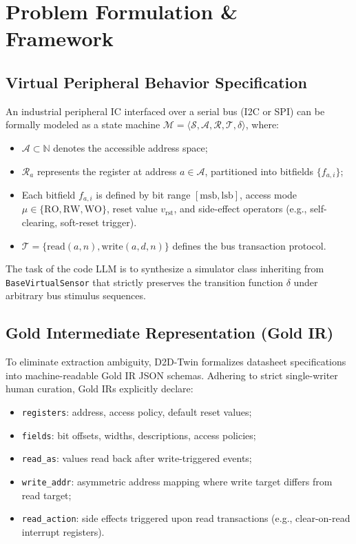 \documentclass[conference]{IEEEtran}
\begin{document}
\section{Problem Formulation \& Framework}

\subsection{Virtual Peripheral Behavior Specification}
An industrial peripheral IC interfaced over a serial bus (I2C or SPI) can be formally modeled as a state machine $\mathcal{M} = \langle \mathcal{S}, \mathcal{A}, \mathcal{R}, \mathcal{T}, \delta \rangle$, where:
\begin{itemize}
    \item $\mathcal{A} \subset \mathbb{N}$ denotes the accessible address space;
    \item $\mathcal{R}_a$ represents the register at address $a \in \mathcal{A}$, partitioned into bitfields $\{f_{a,i}\}$;
    \item Each bitfield $f_{a,i}$ is defined by bit range $[\text{msb}, \text{lsb}]$, access mode $\mu \in \{\text{RO}, \text{RW}, \text{WO}\}$, reset value $v_{\text{rst}}$, and side-effect operators (e.g., self-clearing, soft-reset trigger).
    \item $\mathcal{T} = \{\text{read}(a, n), \text{write}(a, d, n)\}$ defines the bus transaction protocol.
\end{itemize}

The task of the code LLM is to synthesize a simulator class inheriting from \texttt{BaseVirtualSensor} that strictly preserves the transition function $\delta$ under arbitrary bus stimulus sequences.

\subsection{Gold Intermediate Representation (Gold IR)}
To eliminate extraction ambiguity, D2D-Twin formalizes datasheet specifications into machine-readable Gold IR JSON schemas. Adhering to strict single-writer human curation, Gold IRs explicitly declare:
\begin{itemize}
    \item \texttt{registers}: address, access policy, default reset values;
    \item \texttt{fields}: bit offsets, widths, descriptions, access policies;
    \item \texttt{read\_as}: values read back after write-triggered events;
    \item \texttt{write\_addr}: asymmetric address mapping where write target differs from read target;
    \item \texttt{read\_action}: side effects triggered upon read transactions (e.g., clear-on-read interrupt registers).
\end{itemize}
\end{document}
